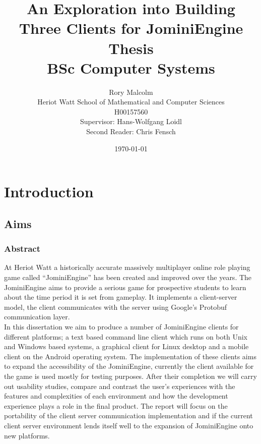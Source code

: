 \documentclass{article}
\title{An Exploration into Building Three Clients for JominiEngine\\ Thesis \\BSc Computer Systems}
\author{Rory Malcolm\\Heriot Watt School of Mathematical and Computer Sciences\\H00157560\\Supervisor: Hans-Wolfgang Loidl\\Second Reader: Chris Fensch}
\date{\today}
\begin{document}
	\maketitle
	\newpage
	\tableofcontents
	\newpage
	\section{Introduction}
	\subsection{Aims}
	\subsubsection{Abstract}
	At Heriot Watt a historically accurate massively multiplayer online role playing game called “JominiEngine” has been created and improved over the years. The JominiEngine aims to provide a serious game for prospective students to learn about the time period it is set from gameplay. It implements a client-server model, the client communicates with the server using Google's Protobuf communication layer.\\

	In this dissertation we aim to produce a number of JominiEngine clients for different platforms; a text based command line client which runs on both Unix and Windows based systems, a graphical client for Linux desktop and a mobile client on the Android operating system. The implementation of these clients aims to expand the accessibility of the JominiEngine, currently the client available for the game is used mostly for testing purposes. After their completion we will carry out usability studies, compare and contrast the user’s experiences with the features and complexities of each environment and how the development experience plays a role in the final product. The report will focus on the portability of the client server communication implementation and if the current client server environment lends itself well to the expansion of JominiEngine onto new platforms.
\end{document}
